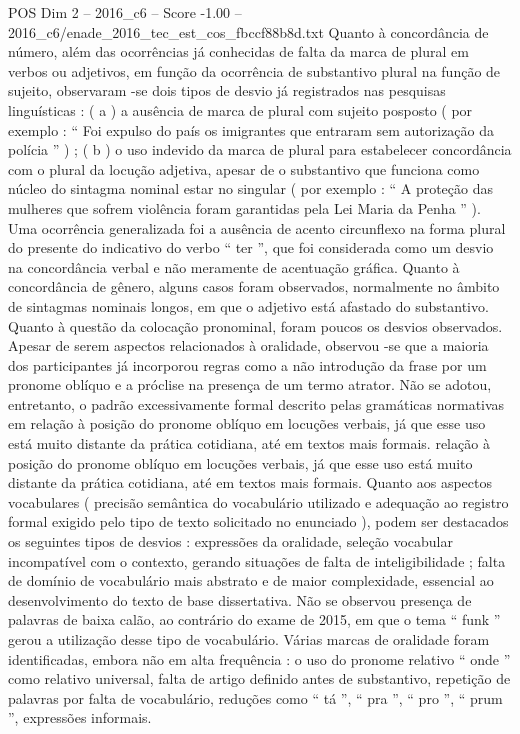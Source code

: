 \begin{textsample}{POS Dim 2 – 2016\_c6 – Score -1.00 – 2016\_c6/enade\_2016\_tec\_est\_cos\_fbccf88b8d.txt}
Quanto à concordância de número, além das ocorrências já conhecidas de falta da marca de plural em verbos ou adjetivos, em função da ocorrência de substantivo plural na função de sujeito, observaram -se dois tipos de desvio já registrados nas pesquisas linguísticas : ( a ) a ausência de marca de plural com sujeito posposto ( por exemplo : “ Foi expulso do país os imigrantes que entraram sem autorização da polícia ” ) ; ( b ) o uso indevido da marca de plural para estabelecer concordância com o plural da locução adjetiva, apesar de o substantivo que funciona como núcleo do sintagma nominal estar no singular ( por exemplo : “ A proteção das mulheres que sofrem violência foram garantidas pela Lei Maria da Penha ” ).
Uma ocorrência generalizada foi a ausência de acento circunflexo na forma plural do presente do indicativo do verbo “ ter ”, que foi considerada como um desvio na concordância verbal e não meramente de acentuação gráfica.
Quanto à concordância de gênero, alguns casos foram observados, normalmente no âmbito de sintagmas nominais longos, em que o adjetivo está afastado do substantivo.
Quanto à questão da colocação pronominal, foram poucos os desvios observados.
Apesar de serem aspectos relacionados à oralidade, observou -se que a maioria dos participantes já incorporou regras como a não introdução da frase por um pronome oblíquo e a próclise na presença de um termo atrator.
Não se adotou, entretanto, o padrão excessivamente formal descrito pelas gramáticas normativas em relação à posição do pronome oblíquo em locuções verbais, já que esse uso está muito distante da prática cotidiana, até em textos mais formais. relação à posição do pronome oblíquo em locuções verbais, já que esse uso está muito distante da prática cotidiana, até em textos mais formais.
Quanto aos aspectos vocabulares ( precisão semântica do vocabulário utilizado e adequação ao registro formal exigido pelo tipo de texto solicitado no enunciado ), podem ser destacados os seguintes tipos de desvios : expressões da oralidade, seleção vocabular incompatível com o contexto, gerando situações de falta de inteligibilidade ; falta de domínio de vocabulário mais abstrato e de maior complexidade, essencial ao desenvolvimento do texto de base dissertativa.
Não se observou presença de palavras de baixa calão, ao contrário do exame de 2015, em que o tema “ funk ” gerou a utilização desse tipo de vocabulário.
Várias marcas de oralidade foram identificadas, embora não em alta frequência : o uso do pronome relativo “ onde ” como relativo universal, falta de artigo definido antes de substantivo, repetição de palavras por falta de vocabulário, reduções como “ tá ”, “ pra ”, “ pro ”, “ prum ”, expressões informais.

\end{textsample}
